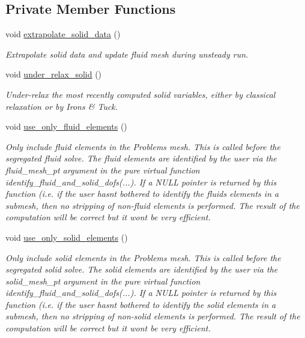 \subsection*{Private Member Functions}
\begin{DoxyCompactItemize}
\item 
void \hyperlink{classoomph_1_1SegregatableFSIProblem_a0e67b39cdae35ea25ef97e5e768aa60a}{extrapolate\+\_\+solid\+\_\+data} ()
\begin{DoxyCompactList}\small\item\em Extrapolate solid data and update fluid mesh during unsteady run. \end{DoxyCompactList}\item 
void \hyperlink{classoomph_1_1SegregatableFSIProblem_a9da3017952982a64496ff9c16ca7024c}{under\+\_\+relax\+\_\+solid} ()
\begin{DoxyCompactList}\small\item\em Under-\/relax the most recently computed solid variables, either by classical relaxation or by Irons \& Tuck. \end{DoxyCompactList}\item 
void \hyperlink{classoomph_1_1SegregatableFSIProblem_a13a9841e0aa05bf57ec228b49b311a26}{use\+\_\+only\+\_\+fluid\+\_\+elements} ()
\begin{DoxyCompactList}\small\item\em Only include fluid elements in the Problem\textquotesingle{}s mesh. This is called before the segregated fluid solve. The fluid elements are identified by the user via the fluid\+\_\+mesh\+\_\+pt argument in the pure virtual function identify\+\_\+fluid\+\_\+and\+\_\+solid\+\_\+dofs(...). If a N\+U\+LL pointer is returned by this function (i.\+e. if the user hasn\textquotesingle{}t bothered to identify the fluids elements in a submesh, then no stripping of non-\/fluid elements is performed. The result of the computation will be correct but it won\textquotesingle{}t be very efficient. \end{DoxyCompactList}\item 
void \hyperlink{classoomph_1_1SegregatableFSIProblem_a330660bc7b69c9c128bfed62b54dcf62}{use\+\_\+only\+\_\+solid\+\_\+elements} ()
\begin{DoxyCompactList}\small\item\em Only include solid elements in the Problem\textquotesingle{}s mesh. This is called before the segregated solid solve. The solid elements are identified by the user via the solid\+\_\+mesh\+\_\+pt argument in the pure virtual function identify\+\_\+fluid\+\_\+and\+\_\+solid\+\_\+dofs(...). If a N\+U\+LL pointer is returned by this function (i.\+e. if the user hasn\textquotesingle{}t bothered to identify the solid elements in a submesh, then no stripping of non-\/solid elements is performed. The result of the computation will be correct but it won\textquotesingle{}t be very efficient. \end{DoxyCompactList}\item 

\end{DoxyCompactItemize}
